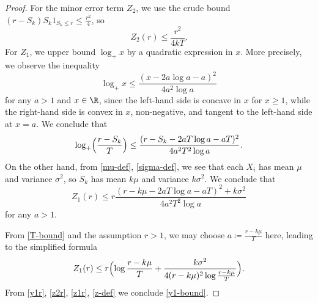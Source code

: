 \begin{proof}
For the minor error term $Z_2$, we use the crude bound $(r-S_k) S_k1_{S_k \leq r} \leq \frac{r^2}{4}$, so
\begin{equation}\label{z2r}
Z_2(r) \leq \frac{r^2}{4kT}.
\end{equation}
For $Z_1$, we upper bound $\log_+ x$ by a quadratic expression in $x$.  More precisely, we observe the inequality
$$ \log_+ x \leq \frac{(x-2a\log a-a)^2}{4a^2 \log a}$$
for any $a > 1$ and $x \in \R$, since the left-hand side is concave in $x$ for $x \geq 1$, while the right-hand side is convex in $x$, non-negative, and tangent to the left-hand side at $x=a$.  We conclude that
$$ \log_+ \Bigl(\frac{r-S_k}{T}\Bigr) \leq \frac{(r-S_k-2aT\log a-aT)^2}{4a^2 T^2 \log a}.$$
On the other hand, from \eqref{mu-def}, \eqref{sigma-def}, we see that each $X_i$ has mean $\mu$ and variance $\sigma^2$, so $S_k$ has mean $k\mu$ and variance $k\sigma^2$.  We conclude that
$$ Z_1(r) \leq r \frac{ (r-k\mu-2aT\log a-aT)^2 + k \sigma^2}{4a^2 T^2 \log a}$$
for any $a > 1$.

From \eqref{T-bound} and the assumption $r > 1$, we may choose $a \coloneqq \frac{r-k\mu}{T}$ here, leading to the simplified formula
\begin{equation}\label{z1r}
Z_1(r) \leq r \Bigl( \log \frac{r-k\mu}{T} + \frac{k\sigma^2}{4(r-k\mu)^2 \log \frac{r-k\mu}{T}}\Bigr).
\end{equation}
From \eqref{y1r}, \eqref{z2r}, \eqref{z1r}, \eqref{z-def} we conclude \eqref{y1-bound}.


\end{proof}

